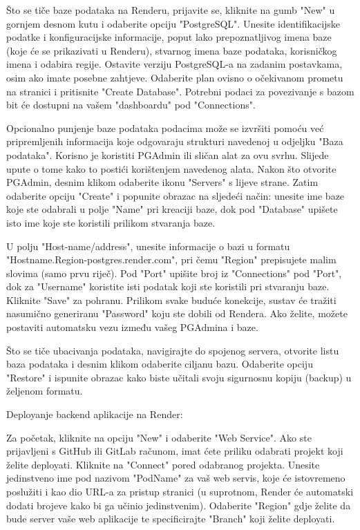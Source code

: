 Što se tiče baze podataka na Renderu, prijavite se, kliknite na gumb "New" u gornjem desnom kutu i odaberite opciju "PostgreSQL". Unesite identifikacijske podatke i konfiguracijske informacije, poput lako prepoznatljivog imena baze (koje će se prikazivati u Renderu), stvarnog imena baze podataka, korisničkog imena i odabira regije. Ostavite verziju PostgreSQL-a na zadanim postavkama, osim ako imate posebne zahtjeve. Odaberite plan ovisno o očekivanom prometu na stranici i pritisnite "Create Database". Potrebni podaci za povezivanje s bazom bit će dostupni na vašem "dashboardu" pod "Connections".

Opcionalno punjenje baze podataka podacima može se izvršiti pomoću već pripremljenih informacija koje odgovaraju strukturi navedenoj u odjeljku "Baza podataka". Korisno je koristiti PGAdmin ili sličan alat za ovu svrhu. Slijede upute o tome kako to postići korištenjem navedenog alata. Nakon što otvorite PGAdmin, desnim klikom odaberite ikonu "Servers" s lijeve strane. Zatim odaberite opciju "Create" i popunite obrazac na sljedeći način: unesite ime baze koje ste odabrali u polje "Name" pri kreaciji baze, dok pod "Database" upišete isto ime koje ste koristili prilikom stvaranja baze.

U polju "Host-name/address", unesite informacije o bazi u formatu "Hostname.Region-postgres.render.com", pri čemu "Region" prepisujete malim slovima (samo prvu riječ). Pod "Port" upišite broj iz "Connections" pod "Port", dok za "Username" koristite isti podatak koji ste koristili pri stvaranju baze. Kliknite "Save" za pohranu. Prilikom svake buduće konekcije, sustav će tražiti nasumično generiranu "Password" koju ste dobili od Rendera. Ako želite, možete postaviti automatsku vezu između vašeg PGAdmina i baze.

Što se tiče ubacivanja podataka, navigirajte do spojenog servera, otvorite listu baza podataka i desnim klikom odaberite ciljanu bazu. Odaberite opciju "Restore" i ispunite obrazac kako biste učitali svoju sigurnosnu kopiju (backup) u željenom formatu.

Deployanje backend aplikacije na Render:

Za početak, kliknite na opciju "New" i odaberite "Web Service". Ako ste prijavljeni s GitHub ili GitLab računom, imat ćete priliku odabrati projekt koji želite deployati. Kliknite na "Connect" pored odabranog projekta. Unesite jedinstveno ime pod nazivom "PodName" za vaš web servis, koje će istovremeno poslužiti i kao dio URL-a za pristup stranici (u suprotnom, Render će automatski dodati brojeve kako bi ga učinio jedinstvenim). Odaberite "Region" gdje želite da bude server vaše web aplikacije te specificirajte "Branch" koji želite deployati.

